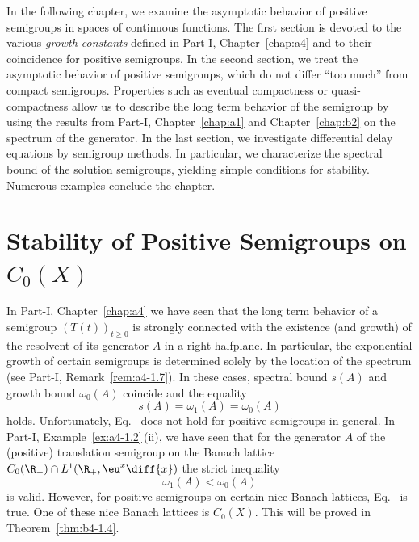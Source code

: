 \setcounter{section}{0}
\label{chap:b4}
\thispagestyle{empty}
In the following chapter, we examine the asymptotic behavior%
of positive semigroups in spaces of continuous functions.
The first section is devoted to the various \emph{growth constants} defined in Part-I, Chapter~\ref{chap:a4} and to their coincidence for positive semigroups.
In the second section, we treat the asymptotic behavior of positive semigroups, which do not differ \enquote{too much} from compact semigroups.
Properties such as eventual compactness or quasi-compactness allow us to describe the long term behavior of the semigroup by using the results from Part-I, Chapter~\ref{chap:a1} and Chapter~\ref{chap:b2} on the spectrum of the generator.
In the last section, we investigate differential delay equations by semigroup methods. 
In particular, we characterize the spectral bound of the solution semigroups, yielding simple conditions for stability. 
Numerous examples conclude the chapter.
\section{Stability of Positive Semigroups on \texorpdfstring{$C_{0}(X)$}{C\textsubscript{0}(X)}}\label{sec:b4-1}%
\hspace{1cm}{\Large by Frank Neubrander}
\vspace{.5cm}
\newline
In Part-I, Chapter~\ref{chap:a4} we have seen that the long term behavior of a semigroup $(T(t))_{t \geq 0}$ is strongly connected with the existence (and growth) of the resolvent of its generator $A$ in a right halfplane.
In particular, the exponential growth of certain semigroups is determined solely by the location of the spectrum (see Part-I, Remark~\ref{rem:a4-1.7}).
In these cases, spectral bound%
$s(A)$ and growth bound%
$\omega_{0}(A)$ coincide and the equality
\begin{equation}\label{eq:b4-1.1}
   s(A) = \omega_1(A) = \omega_{0}(A)
\end{equation}
holds.
Unfortunately, Eq.~ does not hold for positive semigroups in general.
In Part-I, Example~\ref{ex:a4-1.2}\,(ii), we have seen that for the generator $A$ of the (positive) translation semigroup on the Banach lattice $C_{0}(\R_+) \cap L^1(\R_+,\eu^x \diff{x})$ the strict inequality 
\[
\omega_1(A) < \omega_{0}(A)
\]
is valid.
However, for positive semigroups on certain nice Banach lattices, Eq.~ is true.
One of these nice Banach lattices is $C_{0}(X)$. 
This will be proved in Theorem~\ref{thm:b4-1.4}.

